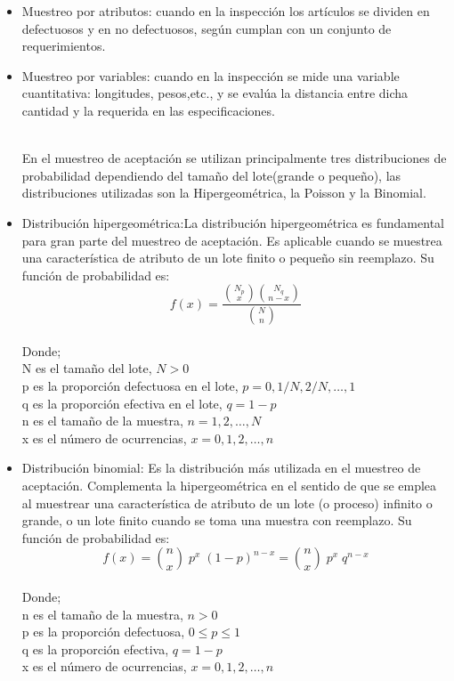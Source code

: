 \begin{itemize}
\item Muestreo por atributos: cuando en la inspecci\'{o}n los art\'{i}culos se dividen en defectuosos y en no defectuosos, seg\'{u}n cumplan con un conjunto de requerimientos.
\item Muestreo por variables: cuando en la inspecci\'{o}n se mide una variable cuantitativa: longitudes, pesos,etc., y se eval\'{u}a la distancia entre dicha cantidad y la requerida en las especificaciones.

~\\En el muestreo de aceptaci\'{o}n se utilizan principalmente tres distribuciones de probabilidad dependiendo del tama\~{n}o del lote(grande o peque\~{n}o), las distribuciones utilizadas son la Hipergeom\'{e}trica, la Poisson y la Binomial.

\item Distribuci\'{o}n hipergeom\'{e}trica:La distribuci\'{o}n hipergeom\'{e}trica es fundamental para gran parte del muestreo de aceptaci\'{o}n. Es aplicable cuando se muestrea una caracter\'{i}stica de atributo de un lote finito o peque\~{n}o sin reemplazo. Su funci\'{o}n de probabilidad es:
$$f(x)=\frac{\binom{N_p}{x}\binom{N_q}{n-x}}{\binom{N}{n}}$$
~\\ Donde; 
~\\ N es el tama\~{n}o del lote, $N>0$
~\\ p es la proporci\'{o}n defectuosa en el lote, $p=0, 1/N, 2/N, \dots , 1$
~\\ q es la proporci\'{o}n efectiva en el lote,  $q=1-p$
~\\ n es el tama\~{n}o de la muestra, $n = 1, 2,\dots, N$
~\\ x es el n\'{u}mero de ocurrencias, $x = 0, 1, 2,\dots, n$

\item Distribuci\'{o}n binomial: Es la distribuci\'{o}n m\'{a}s utilizada en el muestreo de aceptaci\'{o}n. Complementa la hipergeom\'{e}trica en el sentido de que se emplea al muestrear una caracter\'{i}stica de atributo de un lote (o proceso) infinito o grande, o un lote finito cuando se toma una muestra con reemplazo. Su funci\'{o}n de probabilidad es:
$$f(x)=\binom{n}{x} \; p^x \; (1-p)^{n-x}=\binom{n}{x} \; p^x \; q^{n-x}$$
~\\ Donde; 
~\\ n es el tama\~{n}o de la muestra, $n>0$
~\\ p es la proporci\'{o}n defectuosa, $0\leq p \leq 1$
~\\ q es la proporci\'{o}n efectiva, $q=1-p$
~\\ x es el n\'{u}mero de ocurrencias, $x = 0, 1, 2,\dots, n$


\end{itemize}
